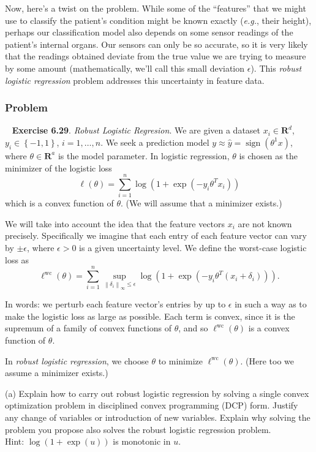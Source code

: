 \documentclass[12pt,reqno]{article}
\theoremstyle{definition}
\numberwithin{equation}{section}
\begin{document}
\noindent Now, here's a twist on the problem. While some of the ``features'' that we might use to classify the patient's condition
might be known exactly (\textit{e.g.}, their height), perhaps our classification model also depends on some sensor readings
of the patient's internal organs. Our sensors can only be so accurate, so it is very likely that the readings obtained
deviate from the true value we are trying to measure by some amount (mathematically, we'll call this small deviation $\epsilon$).
This \textit{robust logistic regression} problem addresses this uncertainty in feature data.

\subsubsection*{Problem}

~\cite{EE364a-extra} \textbf{Exercise 6.29}. \textit{Robust Logistic Regresion}.
We are given a dataset $x_i \in \mathbf{R}^d$, $y_i \in \left\{ -1, 1 \right\}$, $i = 1, \ldots, n$.
We seek a prediction model $y \approx \hat{y}=\operatorname{sign}\left(\theta^1 x\right)$, where $\theta \in \mathbf{R}^a$ is the model parameter. In logistic regression, $\theta$ is chosen as the minimizer of the logistic loss
\[
\ell(\theta)=\sum_{i=1}^n \log \left(1+\exp \left(-y_i \theta^T x_i\right)\right)
\]
which is a convex function of $\theta$. (We will assume that a minimizer exists.)

\noindent We will take into account the idea that the feature vectors $x_i$ are not known precisely.
Specifically we imagine that each entry of each feature vector can vary by $\pm \epsilon$, where $\epsilon>0$ is a given uncertainty level.
We define the worst-case logistic loss as
\[
\ell^{\mathrm{wc}}(\theta)=\sum_{i=1}^n \sup _{\left\|\delta_i\right\|_{\infty} \leq \epsilon} \log \left(1+\exp \left(-y_i \theta^T\left(x_i+\delta_i\right)\right)\right) .
\]

\noindent In words: we perturb each feature vector's entries by up to $\epsilon$ in such a way as to make the logistic loss as large as possible. Each term is convex, since it is the supremum of a family of convex functions of $\theta$, and so $\ell^{\mathrm{wc}}(\theta)$ is a convex function of $\theta$.

\vspace{0.1cm}
\noindent In \textit{robust logistic regression}, we choose $\theta$ to minimize $\ell^{\mathrm{wc}}(\theta)$.
(Here too we assume a minimizer exists.)

\vspace{0.1cm}
\noindent (a) Explain how to carry out robust logistic regression by solving a single convex optimization problem in disciplined convex programming (DCP) form.
Justify any change of variables or introduction of new variables.
Explain why solving the problem you propose also solves the robust logistic regression problem.\\
\noindent Hint: $\log (1+\exp (u))$ is monotonic in $u$.
\end{document}
